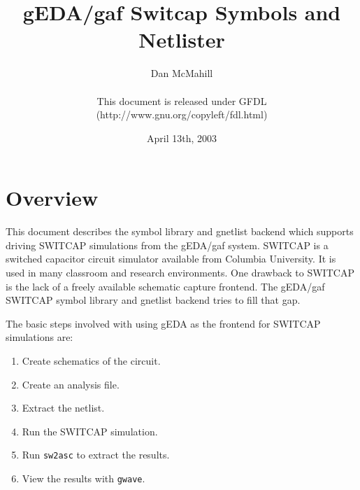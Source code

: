 \documentclass{article}
\title{gEDA/gaf Switcap Symbols and Netlister}
\author{Dan McMahill\\
        \\
        This document is released under GFDL\\ 
        (http://www.gnu.org/copyleft/fdl.html)}
\date{April 13th, 2003}
\begin{document}
\maketitle
\newpage

\tableofcontents
\newpage


\section{Overview}

This document describes the symbol library and gnetlist backend which
supports driving SWITCAP simulations from the gEDA/gaf system.
SWITCAP is a switched capacitor circuit simulator available from
Columbia University.  It is used in many classroom and research
environments.  One drawback to SWITCAP is the lack of a freely
available schematic capture frontend.  The gEDA/gaf SWITCAP symbol
library and gnetlist backend tries to fill that gap.

The basic steps involved with using gEDA as the frontend for SWITCAP
simulations are:

\begin{enumerate}
\item Create schematics of the circuit.
\item Create an analysis file.
\item Extract the netlist.
\item Run the SWITCAP simulation.
\item Run {\tt sw2asc} to extract the results.
\item View the results with {\tt gwave}.
\end{enumerate}
\end{document}
